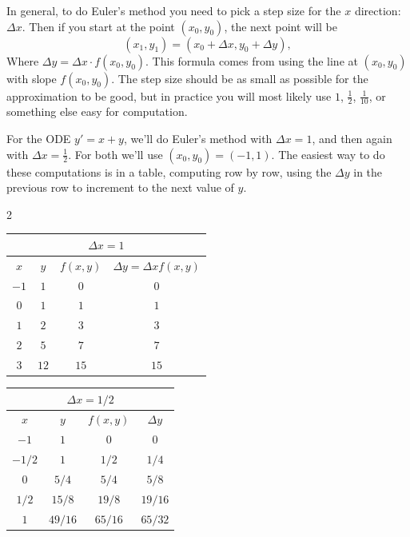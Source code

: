 In general, to do Euler's method you need to pick a step size for the $x$ direction: $\Delta x$. Then if you start at the point $(x_0, y_0)$, the next point will be
$$(x_1,y_1) = (x_0 + \Delta x, y_0 + \Delta y),$$
Where $\Delta y = \Delta x\cdot f(x_0, y_0)$. This formula comes from using the line at $(x_0, y_0)$ with slope $f(x_0, y_0)$.  The step size should be as small as possible for the approximation to be good, but in practice you will most likely use $1$, $\frac12$, $\frac1{10}$, or something else easy for computation.
\begin{exampleblock}[breakable]
For the ODE $y'=x+y$, we'll do Euler's method with $\Delta x = 1$, and then again with $\Delta x = \frac{1}{2}$. For both we'll use $(x_0,y_0)=(-1,1)$. The easiest way to do these computations is in a table, computing row by row, using the $\Delta y$ in the previous row to increment to the next value of $y$.

\begin{multicols}{2}
\setlength{\tabcolsep}{4pt}
\begin{center}
\def\arraystretch{1.2}
\begin{tabular}{@{}cccc@{}}
\multicolumn{4}{c}{$\Delta x = 1$}\\
\midrule[0.4mm]
$x$ & $y$ & $f(x,y)$ & $\Delta y = \Delta x f(x,y)$ \\
\midrule
$-1$ & $1$ & $0$ & $0$\\
$0$ & $1$ & $1$ & $1$\\
$1$ & $2$ & $3$ & $3$\\
$2$ & $5$ & $7$ & $7$\\
$3$ & $12$ & $15$ & $15$\\
\bottomrule[0.4mm]
\end{tabular}
\end{center}

\columnbreak

\begin{center}
\def\arraystretch{1.2}
\begin{tabular}{@{}cccc@{}}
\multicolumn{4}{c}{$\Delta x = 1/2$}\\
\midrule[0.4mm]
$x$ & $y$ & $f(x,y)$ & $\Delta y$ \\
\midrule
$-1$ & $1$ & $0$ & $0$\\
$-1/2$ & $1$ & $1/2$ & $1/4$\\
$0$ & $5/4$ & $5/4$ & $5/8$\\
$1/2$ & $15/8$ & $19/8$ & $19/16$\\
$1$ & $49/16$ & $65/16$ & $65/32$\\
\bottomrule[0.4mm]
\end{tabular}
\end{center}
\end{multicols}



\end{exampleblock}
